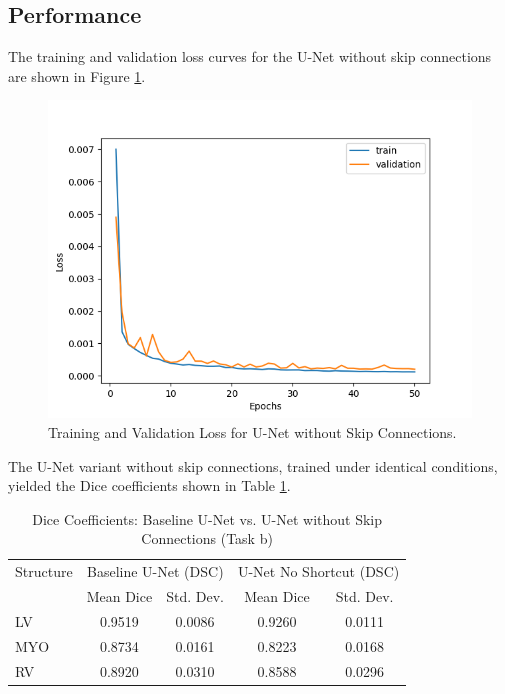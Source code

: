 \documentclass{article}
\begin{document}
\subsection{Performance}
The training and validation loss curves for the U-Net without skip connections are shown in Figure \ref{fig:no_shortcut_loss}.
\begin{figure}[H]
  \centering
  \includegraphics[width=0.8\linewidth]{../result/no_shortcut_unet.png}
  \caption{Training and Validation Loss for U-Net without Skip Connections.}
  \label{fig:no_shortcut_loss}
\end{figure}

The U-Net variant without skip connections, trained under identical conditions, yielded the Dice coefficients shown in Table \ref{tab:no_shortcut_unet_comparison}.
\begin{table}[H]
  \centering
  \caption{Dice Coefficients: Baseline U-Net vs. U-Net without Skip Connections (Task b)}
  \label{tab:no_shortcut_unet_comparison}
  \begin{tabular}{l|cc|cc}
    \toprule
    Structure & \multicolumn{2}{c|}{Baseline U-Net (DSC)} & \multicolumn{2}{c}{U-Net No Shortcut (DSC)}                         \\
              & Mean Dice                                 & Std. Dev.                                   & Mean Dice & Std. Dev. \\
    \midrule
    LV        & 0.9519                                    & 0.0086                                      & 0.9260    & 0.0111    \\
    MYO       & 0.8734                                    & 0.0161                                      & 0.8223    & 0.0168    \\
    RV        & 0.8920                                    & 0.0310                                      & 0.8588    & 0.0296    \\
    \bottomrule
  \end{tabular}
\end{table}
\end{document}
